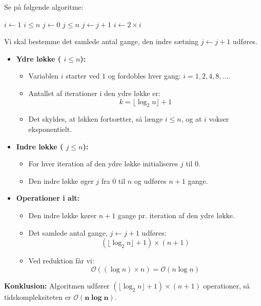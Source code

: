 \begin{example}

    Se på følgende algoritme:
    
    \begin{codebox}
        \li $i \gets 1$
        \li \While $i \leq n$ \Do
        \li     $j \gets 0$
        \li     \While $j \leq n$ \Do
        \li         $j \gets j + 1$
                \End
        \li     $i \gets 2 \times i$
            \End
    \end{codebox}
    
    Vi skal bestemme det samlede antal gange, den indre sætning $j \gets j + 1$ udføres.
    
    \begin{itemize}
        \item \textbf{Ydre løkke (\texttt{\While} $i \leq n$):}
        \begin{itemize}
            \item Variablen $i$ starter ved $1$ og fordobles hver gang: $i = 1, 2, 4, 8, \ldots$.
            \item Antallet af iterationer i den ydre løkke er:
            \[ k = \lfloor \log_2 n \rfloor + 1 \]
            \item Det skyldes, at løkken fortsætter, så længe $i \leq n$, og at $i$ vokser eksponentielt.
        \end{itemize}
        \item \textbf{Indre løkke (\texttt{\While} $j \leq n$):}
        \begin{itemize}
            \item For hver iteration af den ydre løkke initialiseres $j$ til $0$.
            \item Den indre løkke øger $j$ fra $0$ til $n$ og udføres $n + 1$ gange.
        \end{itemize}
        \item \textbf{Operationer i alt:}
        \begin{itemize}
            \item Den indre løkke kører $n + 1$ gange pr. iteration af den ydre løkke.
            \item Det samlede antal gange, $j \gets j + 1$ udføres:
            \[ (\lfloor \log_2 n \rfloor + 1) \times (n + 1) \]
            \item Ved reduktion får vi:
            \[ \mathcal{O}((\log n) \times n) = \mathcal{O}(n \log n) \]
        \end{itemize}
    \end{itemize}
    
    \textbf{Konklusion:} Algoritmen udfører $(\lfloor \log_2 n \rfloor + 1) \times (n + 1)$ operationer, så tidskompleksiteten er $\boldsymbol{\mathcal{O}(n \log n)}$.
    
\end{example}

